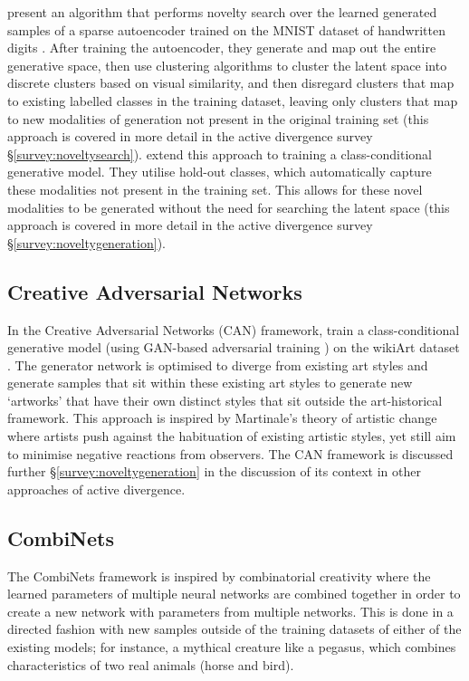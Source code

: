 \citet{kazakcci2016digits} present an algorithm that performs novelty search over the learned generated samples of a sparse autoencoder trained on the MNIST dataset of handwritten digits \citep{lecun1998gradient}.
After training the autoencoder, they generate and map out the entire generative space, then use clustering algorithms to cluster the latent space into discrete clusters based on visual similarity, and then disregard clusters that map to existing labelled classes in the training dataset, leaving only clusters that map to new modalities of generation not present in the original training set (this approach is covered in more detail in the active divergence survey \S \ref{survey:noveltysearch}). 
\citep{cherti2017out} extend this approach to training a class-conditional generative model. 
They utilise hold-out classes, which automatically capture these modalities not present in the training set. 
This allows for these novel modalities to be generated without the need for searching the latent space (this approach is covered in more detail in the active divergence survey \S \ref{survey:noveltygeneration}).   

\subsection{Creative Adversarial Networks}

In the Creative Adversarial Networks (CAN) framework, \cite{elgammal2017can} train a class-conditional generative model (using GAN-based adversarial training \citep{goodfellow2014generative}) on the wikiArt dataset \citep{saleh2016large}. 
The generator network is optimised to diverge from existing art styles and generate samples that sit within these existing art styles to generate new `artworks' that have their own distinct styles that sit outside the art-historical framework.
This approach is inspired by Martinale's theory of artistic change \citep{martindale1990clockwork} where artists push against the habituation of existing artistic styles, yet still aim to minimise negative reactions from observers. 
The CAN framework is discussed further \S \ref{survey:noveltygeneration} in the discussion of its context in other approaches of active divergence. 

\subsection{CombiNets}

The CombiNets framework \citep{guzdial2018combinets} is inspired by combinatorial creativity  \citep{boden2004creative} where the learned parameters of multiple neural networks are combined together in order to create a new network with parameters from multiple networks.
This is done in a directed fashion with new samples outside of the training datasets of either of the existing models; for instance, a mythical creature like a pegasus, which combines characteristics of two real animals (horse and bird).

